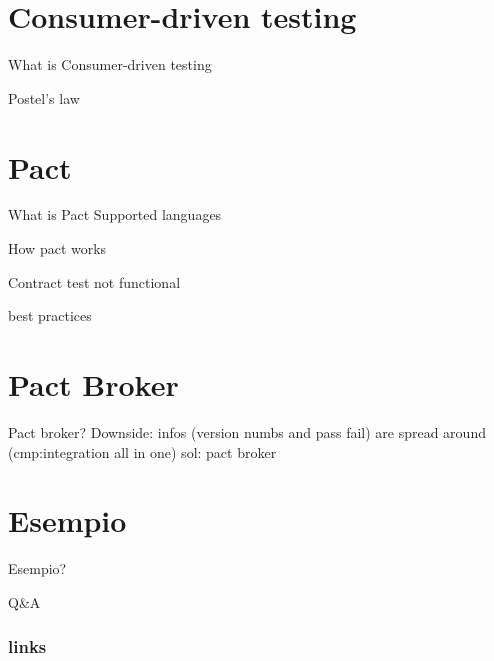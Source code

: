 \documentclass[aspectratio=169]{beamer}
\begin{document}
\section{Consumer-driven testing}
\begin{frame}
What is Consumer-driven testing
\end{frame}

\begin{frame}
Postel's law
\end{frame}

\section{Pact}
\begin{frame}
What is Pact
Supported languages
\end{frame}

\begin{frame}
How pact works
\end{frame}

\begin{frame}
Contract test not functional
\end{frame}

\begin{frame}
best practices
\end{frame}

\section{Pact Broker}
\begin{frame}
Pact broker?%
Downside: infos (version numbs and pass fail) are spread around (cmp:integration all in one)
sol: pact broker
\end{frame}

\section{Esempio}
\begin{frame}
Esempio?
\end{frame}

\begin{frame}
Q\&A
\end{frame}

\begin{frame}
\frametitle{links}
\end{frame}
\end{document}
